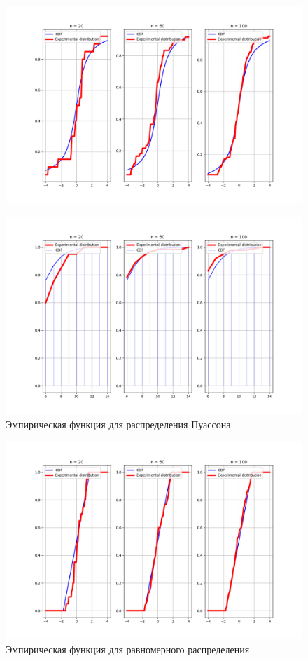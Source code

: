 \documentclass[a4]{article}
\begin{document}
\begin{center}
\begin{figure}[H]
		\includegraphics[width=\textwidth]{Lab4_cauchy_cdf.png}
	\end{figure}
	\begin{figure}[H]
		\caption{Эмпирическая функция для распределения Пуассона}
		\includegraphics[width=\textwidth]{Lab4_poisson_cdf.png}
	\end{figure}
	\begin{figure}[H]
		\caption{Эмпирическая функция для равномерного распределения}
		\includegraphics[width=\textwidth]{Lab4_uniform_cdf.png}
	\end{figure}
\end{center}
\end{document}
